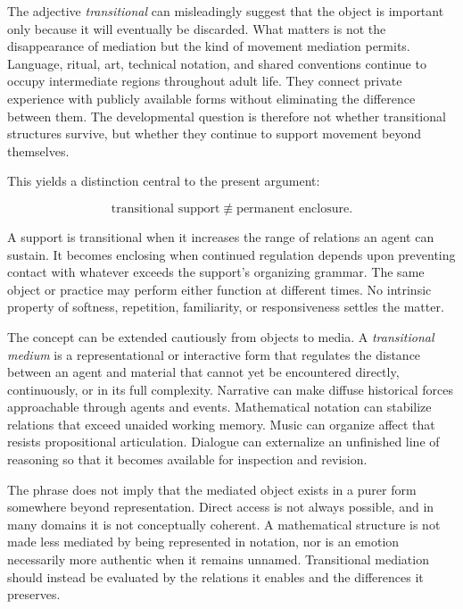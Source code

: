 \documentclass[11pt]{article}
\newcommand{\term}[1]{\emph{#1}}
\begin{document}
The adjective \term{transitional} can misleadingly suggest that the object is
important only because it will eventually be discarded. What matters is not
the disappearance of mediation but the kind of movement mediation permits.
Language, ritual, art, technical notation, and shared conventions continue to
occupy intermediate regions throughout adult life. They connect private
experience with publicly available forms without eliminating the difference
between them. The developmental question is therefore not whether transitional
structures survive, but whether they continue to support movement beyond
themselves.

This yields a distinction central to the present argument:

\begin{equation}
  \text{transitional support}
  \not\equiv
  \text{permanent enclosure}.
  \label{eq:transition-enclosure}
\end{equation}

A support is transitional when it increases the range of relations an agent
can sustain. It becomes enclosing when continued regulation depends upon
preventing contact with whatever exceeds the support's organizing grammar.
The same object or practice may perform either function at different times.
No intrinsic property of softness, repetition, familiarity, or responsiveness
settles the matter.

The concept can be extended cautiously from objects to media. A
\term{transitional medium} is a representational or interactive form that
regulates the distance between an agent and material that cannot yet be
encountered directly, continuously, or in its full complexity. Narrative can
make diffuse historical forces approachable through agents and events.
Mathematical notation can stabilize relations that exceed unaided working
memory. Music can organize affect that resists propositional articulation.
Dialogue can externalize an unfinished line of reasoning so that it becomes
available for inspection and revision.

The phrase does not imply that the mediated object exists in a purer form
somewhere beyond representation. Direct access is not always possible, and in
many domains it is not conceptually coherent. A mathematical structure is not
made less mediated by being represented in notation, nor is an emotion
necessarily more authentic when it remains unnamed. Transitional mediation
should instead be evaluated by the relations it enables and the differences it
preserves.
\end{document}
